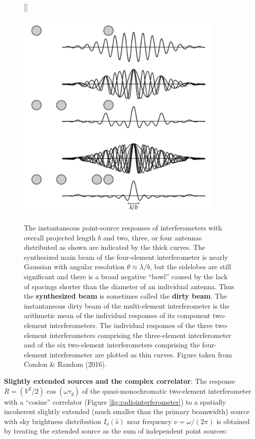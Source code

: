 \documentclass[a4paper,10pt]{article}
\begin{document}
\begin{figure}[t]
    [\FBwidth]
    {\caption{\footnotesize{The instantaneous point-source responses of interferometers with overall projected length $b$ and two, three, or four antennas distributed as shown are indicated by the thick curves. The synthesized main beam of the four-element interferometer is nearly Gaussian with angular resolution $\theta\approx\lambda/b$, but the sidelobes are still significant and there is a broad negative ``bowl'' caused by the lack of spacings shorter than the diameter of an individual antenna. Thus the \textbf{synthesized beam} is sometimes called the \textbf{dirty beam}. The instantaneous dirty beam of the multi-element interferometer is the arithmetic mean of the individual responses of its component two-element interferometers. The individual responses of the three two-element interferometers comprising the three-element interferometer and of the six two-element interferometers comprising the four-element interferometer are plotted as thin curves. Figure taken from Condon \& Random (2016).}}
    \label{fig:interferometerbeam}}
    {\includegraphics[width=10cm]{figures/InterferometerBeam.png}}
\end{figure}

{\noindent}\textbf{Slightly extended sources and the complex correlator}: The response $R=(V^2/2)\cos(\omega\tau_g)$ of the quasi-monochromatic two-element interferometer with a ``cosine'' correlator (Figure \ref{fig:radiointerferometer}) to a spatially incoherent slightly extended (much smaller than the primary beamwidth) source with sky brightness distribution $I_\nu(\hat{s})$ near frequency $\nu=\omega/(2\pi)$ is obtained by treating the extended source as the sum of independent point sources:
\end{document}
